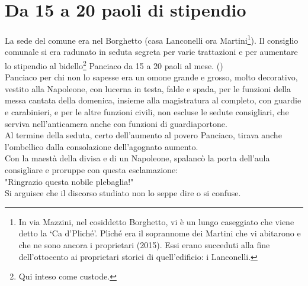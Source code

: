 \documentclass[10pt]{memoir} %
\begin{document}

\chapter{Da 15 a 20 paoli di stipendio}
La sede del comune era nel Borghetto (casa Lanconelli ora Martini\footnote{In via Mazzini, nel cosiddetto Borghetto, vi è un lungo caseggiato che viene detto  la ‘Ca d’Pliché’. Pliché era il soprannome dei Martini che vi abitarono e che ne sono ancora i proprietari (2015). Essi erano succeduti alla fine dell’ottocento ai proprietari storici di quell’edificio: i Lanconelli.}). Il consiglio comunale si era radunato in seduta segreta per varie trattazioni e per aumentare lo stipendio al bidello\footnote{Qui inteso come custode.} Panciaco da 15 a 20 paoli al mese. (\normalfont \:)\\ 
Panciaco per chi non lo sapesse era un omone grande e grosso, molto decorativo, vestito alla Napoleone, con lucerna in testa, falde e spada, per le funzioni della messa cantata della domenica, insieme alla magistratura al completo, con guardie e carabinieri, e per le altre funzioni civili, non escluse le sedute consigliari, che serviva nell'anticamera anche con funzioni di guardiaportone.\\
Al termine della seduta, certo dell'aumento al povero Panciaco, tirava anche l'ombellico dalla consolazione dell'agognato aumento.\\
Con la maestà della divisa e di un Napoleone, spalancò la porta dell'aula consigliare e proruppe con questa esclamazione: \\
"Ringrazio questa nobile plebaglia!"\\
Si arguisce che il discorso studiato non lo seppe dire o si confuse.

\end{document}
